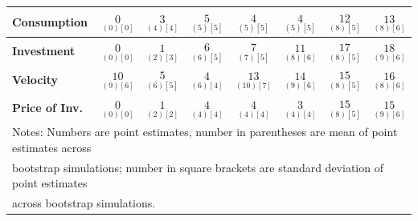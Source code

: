 \documentclass{article}
\begin{document}
\begin{tabular}{|l|c|@{}c|c|@{}c|c|@{}c|c|}
 \textbf{Consumption} & $\underset{(  0) [  0]}{  0}$ & $\underset{(  4) [  4]}{  3}$ & $\underset{(  5) [  5]}{  5}$ & $\underset{(  5) [  5]}{  4}$ & $\underset{(  5) [  5]}{  4}$ & $\underset{(  8) [  5]}{ 12}$ & $\underset{(  8) [  6]}{ 13}$ \\ \hline 
 \textbf{Investment} & $\underset{(  0) [  0]}{  0}$ & $\underset{(  2) [  3]}{  1}$ & $\underset{(  6) [  5]}{  6}$ & $\underset{(  7) [  5]}{  7}$ & $\underset{(  8) [  6]}{ 11}$ & $\underset{(  8) [  5]}{ 17}$ & $\underset{(  9) [  6]}{ 18}$ \\ \hline 
 \textbf{Velocity} & $\underset{(  9) [  6]}{ 10}$ & $\underset{(  6) [  5]}{  5}$ & $\underset{(  6) [  4]}{  4}$ & $\underset{( 10) [  7]}{ 13}$ & $\underset{(  9) [  6]}{ 14}$ & $\underset{(  8) [  5]}{ 15}$ & $\underset{(  8) [  6]}{ 16}$ \\ \hline 
 \textbf{Price of Inv.} & $\underset{(  0) [  0]}{  0}$ & $\underset{(  2) [  2]}{  1}$ & $\underset{(  4) [  4]}{  4}$ & $\underset{(  4) [  4]}{  4}$ & $\underset{(  4) [  4]}{  3}$ & $\underset{(  8) [  5]}{ 15}$ & $\underset{(  9) [  6]}{ 15}$ \\ \hline 
 \multicolumn{8}{|l|}{Notes: Numbers are point estimates, number in 
 parentheses are mean of point estimates across} \\ \hline 
 \multicolumn{8}{|l|}{bootstrap simulations; number in square brackets are 
 standard deviation of point estimates} \\ \hline 
 \multicolumn{8}{|l|}{across bootstrap simulations.} \\ \hline 
 \end{tabular} 
\end{document}
